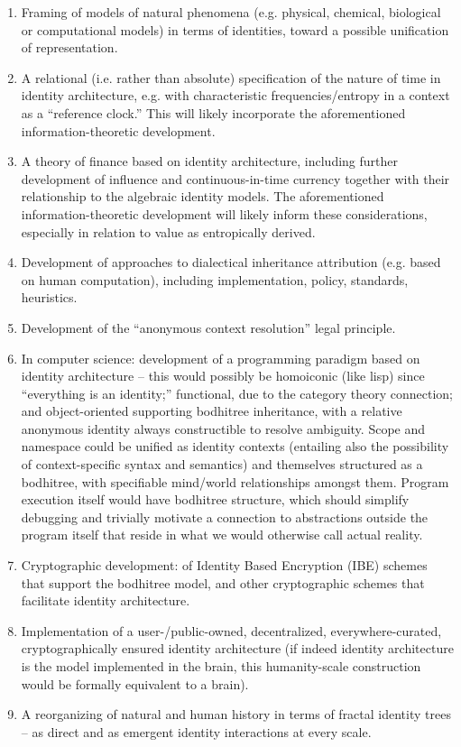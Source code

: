 \documentclass[pra,twocolumn,groupedaddress,10pt]{revtex4}
\theoremstyle{definition}
\begin{document}
\begin{enumerate}
	\item Framing of models of natural phenomena (e.g. physical, chemical, biological or computational models) in terms of identities, toward a possible unification of representation.
	\item A relational (i.e. rather than absolute) specification of the nature of time in identity architecture, e.g. with characteristic frequencies/entropy in a context as a ``reference clock.'' This will likely incorporate the aforementioned information-theoretic development.
	\item A theory of finance based on identity architecture, including further development of influence and continuous-in-time currency together with their relationship to the algebraic identity models. The aforementioned information-theoretic development will likely inform these considerations, especially in relation to value as entropically derived.
	\item Development of approaches to dialectical inheritance attribution (e.g. based on human computation), including implementation, policy, standards, heuristics.
	\item Development of the ``anonymous context resolution'' legal principle.
	\item In computer science: development of a programming paradigm based on identity architecture -- this would possibly be homoiconic (like lisp) since ``everything is an identity;'' functional, due to the category theory connection; and object-oriented supporting bodhitree inheritance, with a relative anonymous identity always constructible to resolve ambiguity. Scope and namespace could be unified as identity contexts (entailing also the possibility of context-specific syntax and semantics) and themselves structured as a bodhitree, with specifiable mind/world relationships amongst them. Program execution itself would have bodhitree structure, which should simplify debugging and trivially motivate a connection to abstractions outside the program itself that reside in what we would otherwise call actual reality.
	\item Cryptographic development: of Identity Based Encryption (IBE) schemes that support the bodhitree model, and other cryptographic schemes that facilitate identity architecture.
	\item Implementation of a user-/public-owned, decentralized, everywhere-curated, cryptographically ensured identity architecture (if indeed identity architecture is the model implemented in the brain, this humanity-scale construction would be formally equivalent to a brain).
	\item A reorganizing of natural and human history in terms of fractal identity trees -- as direct and as emergent identity interactions at every scale.
\end{enumerate}
\end{document}
